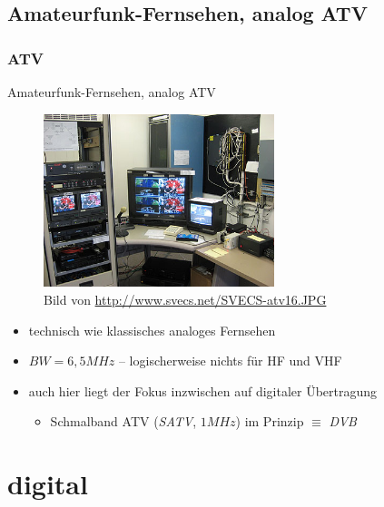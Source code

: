 %
%

\subsection[ATV]{Amateurfunk-Fernsehen, analog ATV}

\begin{frame}
  \frametitle{ATV}

  Amateurfunk-Fernsehen, analog ATV

  \begin{center}
    \begin{figure}
      \includegraphics[width=0.6\textwidth,height=.4\textheight,keepaspectratio]{e16/SVECS-atv16.jpg}
      \caption{Bild von \ExternalLink\url{http://www.svecs.net/SVECS-atv16.JPG}}
    \end{figure}
  \end{center}

  \begin{itemize}
    \item technisch wie klassisches analoges Fernsehen
    \item $BW = 6,5 MHz$ -- logischerweise nichts für HF und VHF
    \item auch hier liegt der Fokus inzwischen auf digitaler Übertragung
      \begin{itemize}
        \item Schmalband ATV (\emph{SATV}, $1 MHz$) im Prinzip $\equiv$ \emph{DVB}
      \end{itemize}
  \end{itemize}

\end{frame}

\section{digital}

